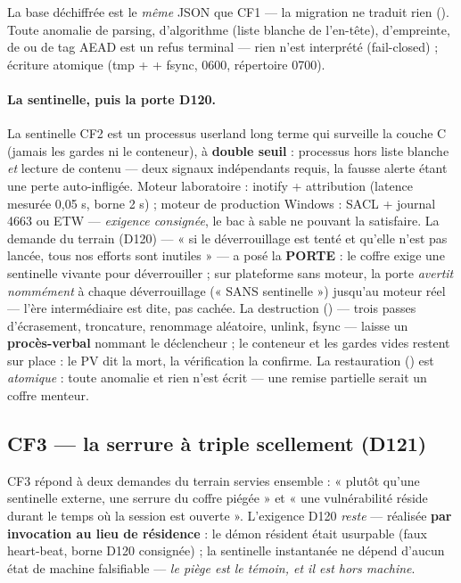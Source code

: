La base déchiffrée est le \emph{même} JSON que CF1 — la migration ne traduit rien
(). Toute anomalie de
parsing, d'algorithme (liste blanche de l'en-tête), d'empreinte, de  ou de
tag AEAD est un refus terminal — rien n'est interprété (fail-closed) ; écriture
atomique (tmp +  + fsync, 0600, répertoire 0700).

\paragraph{La sentinelle, puis la porte D120.} La sentinelle CF2 est un processus
userland long terme qui surveille la couche C (jamais les gardes ni le conteneur), à
\textbf{double seuil} : processus hors liste blanche \emph{et} lecture de contenu — deux
signaux indépendants requis, la fausse alerte étant une perte auto-infligée. Moteur
laboratoire : inotify + attribution  (latence mesurée 0,05 s, borne 2 s) ;
moteur de production Windows : SACL + journal 4663 ou ETW — \emph{exigence consignée},
le bac à sable ne pouvant la satisfaire. La demande du terrain (D120) — « si le
déverrouillage est tenté et qu'elle n'est pas lancée, tous nos efforts sont inutiles » —
a posé la \textbf{PORTE} : le coffre exige une sentinelle vivante pour déverrouiller ;
sur plateforme sans moteur, la porte \emph{avertit nommément} à chaque déverrouillage
(« SANS sentinelle ») jusqu'au moteur réel — l'ère intermédiaire est dite, pas cachée.
La destruction () — trois passes d'écrasement, troncature, renommage
aléatoire, unlink, fsync — laisse un \textbf{procès-verbal} nommant le déclencheur ;
le conteneur et les gardes vides restent sur place : le PV dit la mort, la vérification
la confirme. La restauration () est \emph{atomique} : toute anomalie et
rien n'est écrit — une remise partielle serait un coffre menteur.

\subsection{CF3 — la serrure à triple scellement (D121)}\label{sec:cf3}

CF3 répond à deux demandes du terrain servies ensemble : « plutôt qu'une sentinelle
externe, une serrure du coffre piégée » et « une vulnérabilité réside durant le temps
où la session est ouverte ». L'exigence D120 \emph{reste} — réalisée \textbf{par
invocation au lieu de résidence} : le démon résident était usurpable (faux heart-beat,
borne D120 consignée) ; la sentinelle instantanée ne dépend d'aucun état de machine
falsifiable — \emph{le piège est le témoin, et il est hors machine}.

